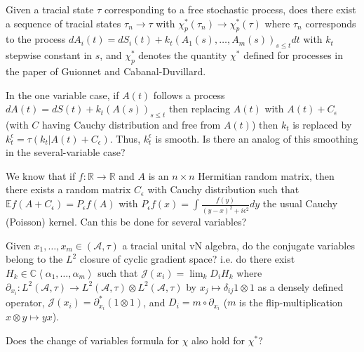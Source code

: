 \documentclass[12pt,letterpaper, reqno]{amsart}
\begin{document}
\begin{problem}
Given a tracial state $\tau$ corresponding
to a free stochastic process, does there exist a sequence of tracial
states $\tau_{n}\rightarrow\tau$ with $\chi_{p}^{*}(\tau_{n})\rightarrow\chi_{p}^{*}(\tau)$
where $\tau_{n}$ corresponds to the process $dA_{i}(t)=dS_{i}(t)+k_{t}(A_{1}(s),\ldots,A_{m}(s))_{s\leq t}dt$
with $k_{t}$ stepwise constant in $s$, and $\chi_{p}^{*}$ denotes
the quantity $\chi^{*}$ defined for processes in the paper of Guionnet
and Cabanal-Duvillard.
\end{problem}

\begin{problem}
In the one variable case, if $A(t)$ follows
a process $dA(t)=dS(t)+k_{t}(A(s))_{s\leq t}$ then replacing $A(t)$
with $A(t)+C_{\epsilon}$ (with $C$ having Cauchy distribution and
free from $A(t)$) then $k_{t}$ is replaced by $k_{t}^{\epsilon}=\tau\left(k_{t}\vert A(t)+C_{\epsilon}\right)$.
Thus, $k_{t}^{\epsilon}$ is smooth. Is there an analog of this smoothing
in the several-variable case?
\end{problem}

\begin{problem}
We know that if $f:\mathbb{R}\rightarrow\mathbb{R}$
and $A$ is an $n\times n$ Hermitian random matrix, then there exists
   a random matrix $C_{\epsilon}$ with Cauchy
distribution such that $\mathbb{E}f(A+C_{\epsilon})=P_{\epsilon}f(A)$
with $P_{\epsilon}f(x)=\int\frac{f(y)}{(y-x)^{2}+i\epsilon^{2}}dy$
the usual Cauchy (Poisson) kernel.    Can this be
done for several variables?
\end{problem}

\begin{problem}
 Given $x_{1},\ldots,x_{m}\in(\mathcal{A},\tau)$
a tracial unital vN algebra, do the conjugate variables belong to
the $L^{2}$ closure of cyclic gradient space? i.e. do there exist
$H_{k}\in\mathbb{C}\left\langle \alpha_{1},\ldots,\alpha_{m}\right\rangle $
such that $\mathcal{J}(x_{i})=\lim_{k}D_{i}H_{k}$ where $\partial_{x_{i}}:L^{2}(\mathcal{A},\tau)\rightarrow L^{2}(\mathcal{A},\tau)\otimes L^{2}(\mathcal{A},\tau)$
by $x_{j}\mapsto\delta_{ij}1\otimes1$ as a densely defined operator,
$\mathcal{J}(x_{i})=\partial_{x_{i}}^{*}(1\otimes1)$, and $D_{i}=m\circ\partial_{x_{i}}$
($m$ is the flip-multiplication $x\otimes y\mapsto yx$).
\end{problem}

\begin{problem}
 Does the change of variables
formula for $\chi$ also hold for $\chi^{*}$?
\end{problem}
\end{document}
